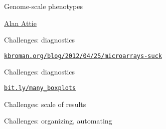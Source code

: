 \documentclass[12pt,t]{beamer}
\begin{document}
\begin{frame}[c]{Genome-scale phenotypes}

\vspace*{5mm}

\hfill
\href{https://biochem.wisc.edu/faculty/attie}{\scriptsize \lolit Alan
  Attie} \hspace{8mm}

\end{frame}



\begin{frame}{Challenges: {\color{foreground} diagnostics}}

\vspace{2mm}


\vspace{3mm}

\hfill \href{https://kbroman.org/blog/2012/04/25/microarrays-suck}{\scriptsize \lolit \tt kbroman.org/blog/2012/04/25/microarrays-suck}

\end{frame}


\begin{frame}{Challenges: {\color{foreground} diagnostics}}

  \vspace{8mm}


\vspace{3mm}

\hfill
\href{https://bit.ly/many_boxplots}{\scriptsize
  \lolit \tt bit.ly/many\_boxplots}

\end{frame}


\begin{frame}[c]{Challenges: {\color{foreground} scale of results}}


\end{frame}




\begin{frame}[c]{Challenges: {\color{foreground} organizing, automating}}


\end{frame}
\end{document}
